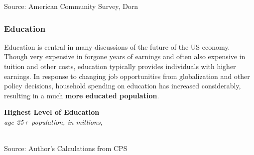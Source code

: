 \documentclass{report}
\newcommand{\tbllink}[1]{\href{https://raw.githubusercontent.com/bdecon/US-chartbook/master/chartbook/data/#1}{\faTable}}
\newcommand{\barylab}[2]{yticklabel style={text width=#1, align=right, 
		style={black!70}, text height=#2},}
\newcommand{\bbar}[2]{extra #1 ticks = {{#2}}, extra #1 tick labels = ,
		extra #1 tick style = {grid=major, grid style={thick, black!25}},}
\newcommand{\barplotnogrid}{xbar=0pt, axis line style={draw=none},
	    yticklabel style={align=left, anchor=east},
      		xmajorticks=false, ymajorgrids=false,   
	    ytick=data, tickwidth=0pt, area legend, reverse legend,
	    nodes near coords, nodes near coords align={horizontal},}
\begin{document}
{\vspace{-3mm}
\footnotesize{Source: American Community Survey, Dorn} \hspace{61mm} \tbllink{acs_cz_age.csv}

\newpage
\begin{minipage}{0.76\textwidth}
\subsubsection*{\color{black!70} \seriffont Education}
\small Education is central in many discussions of the future of the US economy. Though very expensive in forgone years of earnings and often also expensive in tuition and other costs, education typically provides individuals with higher earnings. In response to changing job opportunities from globalization and other policy decisions, household spending on education has increased considerably, resulting in a much \textbf{more educated population}.
\end{minipage}
\vspace{2mm}

\begin{minipage}{0.33\textwidth}
\small  
\end{minipage}\hspace{6mm}
\begin{minipage}{0.39\textwidth}
\normalsize \textbf{Highest Level of Education}\\
\footnotesize{\textit{age 25+ population, in millions, }}\\
\hspace*{-4mm} \\
\footnotesize{Source: Author's Calculations from CPS} \hfill \tbllink{cps_educ_tot.csv}
\end{minipage}
\vspace{2mm}

}
\end{document}
